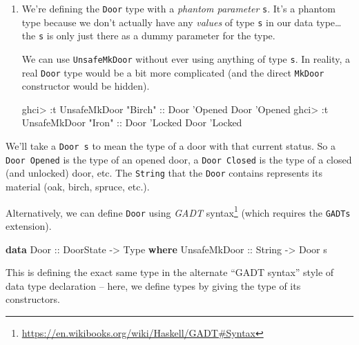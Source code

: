 \documentclass[]{article}
\newenvironment{Shaded}{}{}
\newcommand{\KeywordTok}[1]{\textcolor[rgb]{0.00,0.44,0.13}{\textbf{#1}}}
\newcommand{\DataTypeTok}[1]{\textcolor[rgb]{0.56,0.13,0.00}{#1}}
\newcommand{\CharTok}[1]{\textcolor[rgb]{0.25,0.44,0.63}{#1}}
\newcommand{\StringTok}[1]{\textcolor[rgb]{0.25,0.44,0.63}{#1}}
\newcommand{\OtherTok}[1]{\textcolor[rgb]{0.00,0.44,0.13}{#1}}
\newcommand{\FunctionTok}[1]{\textcolor[rgb]{0.02,0.16,0.49}{#1}}
\newcommand{\NormalTok}[1]{#1}
\renewcommand{\href}[2]{#2\footnote{\url{#1}}}
\begin{document}
\begin{enumerate}
\def\labelenumi{\arabic{enumi}.}
\setcounter{enumi}{2}
\item
  We're defining the \texttt{Door} type with a \emph{phantom parameter}
  \texttt{s}. It's a phantom type because we don't actually have any
  \emph{values} of type \texttt{s} in our data type\ldots{}the \texttt{s} is
  only just there as a dummy parameter for the type.

  We can use \texttt{UnsafeMkDoor} without ever using anything of type
  \texttt{s}. In reality, a real \texttt{Door} type would be a bit more
  complicated (and the direct \texttt{MkDoor} constructor would be hidden).

\begin{Shaded}
\begin{Highlighting}[]
\NormalTok{ghci}\FunctionTok{>} \FunctionTok{:}\NormalTok{t }\DataTypeTok{UnsafeMkDoor} \StringTok{"Birch"}\OtherTok{ ::} \DataTypeTok{Door} \CharTok{'Opened}
\DataTypeTok{Door} \CharTok{'Opened}
\NormalTok{ghci}\FunctionTok{>} \FunctionTok{:}\NormalTok{t }\DataTypeTok{UnsafeMkDoor} \StringTok{"Iron"}\OtherTok{ ::} \DataTypeTok{Door} \CharTok{'Locked}
\DataTypeTok{Door} \CharTok{'Locked}
\end{Highlighting}
\end{Shaded}
\end{enumerate}

We'll take a \texttt{Door\ s} to mean the type of a door with that current
status. So a \texttt{Door\ \textquotesingle{}Opened} is the type of an opened
door, a \texttt{Door\ \textquotesingle{}Closed} is the type of a closed (and
unlocked) door, etc. The \texttt{String} that the \texttt{Door} contains
represents its material (oak, birch, spruce, etc.).

Alternatively, we can define \texttt{Door} using
\href{https://en.wikibooks.org/wiki/Haskell/GADT\#Syntax}{\emph{GADT} syntax}
(which requires the \texttt{GADTs} extension).

\begin{Shaded}
\begin{Highlighting}[]
\KeywordTok{data} \DataTypeTok{Door}\OtherTok{ ::} \DataTypeTok{DoorState} \OtherTok{->} \DataTypeTok{Type} \KeywordTok{where}
    \DataTypeTok{UnsafeMkDoor}\OtherTok{ ::} \DataTypeTok{String} \OtherTok{->} \DataTypeTok{Door}\NormalTok{ s}
\end{Highlighting}
\end{Shaded}

This is defining the exact same type in the alternate ``GADT syntax'' style of
data type declaration -- here, we define types by giving the type of its
constructors.
\end{document}
